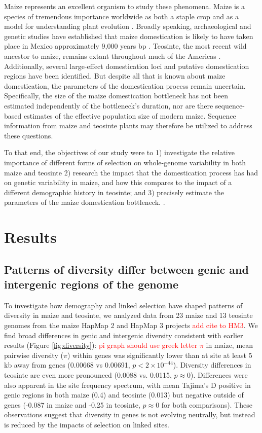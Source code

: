 \documentclass{pnastwo}
\newcommand{\jri}[1]{\textcolor{red}{\scriptsize #1}}
\begin{document}
\begin{article}
Maize represents an excellent organism to study these
phenomena. Maize is a species of tremendous importance worldwide as 
both a staple crop \cite{shiferaw2011} and as a model for
understanding plant evolution \cite{strable2009}. Broadly speaking, archaeological and genetic studies have
established that maize domestication is likely to have taken place in
 Mexico approximately 9,000 years bp
\cite{smith1995,matsuoka2002}. Teosinte, the most
recent wild ancestor to maize, remains extant throughout much of the
Americas \cite{wilkes1967}. Additionally, several large-effect
domestication loci \cite{doebley1995, wills2013, wang2015} and putative domestication
regions \cite{hufford2012} have been identified. But despite all that is
known about maize domestication, the parameters of the
domestication process remain uncertain. Specifically, the size of the
maize domestication bottleneck has not been estimated independently of
the bottleneck's duration, nor are there sequence-based estimates of the effective
population size of modern maize. Sequence information from maize and
teosinte plants may therefore be utilized to address these questions.

To that end, the objectives of our study were to 1) investigate the
relative importance of different forms of selection on whole-genome
variability in both maize and teosinte 2) research the impact that the
domestication process has had on genetic variability in maize, and how
this compares to the impact of a different demographic history in
teosinte; and 3) precisely estimate the parameters of the
maize domestication bottleneck.  \cite{chia2012}.

\section{Results}
\subsection{Patterns of diversity differ between genic and  intergenic regions of the genome}
To investigate how demography and linked selection have shaped patterns of diversity in maize and teosinte, we analyzed data from 23 maize and 13 teosinte genomes from the maize HapMap 2 and HapMap 3 projects \cite{chia2012} \jri{add cite to HM3}.
We find broad differences in genic and intergenic diversity consistent with earlier results  \cite{hufford2012}(Figure \ref{fig:diversity}):  \jri{pi graph should use greek letter $\pi$} in maize, mean pairwise diversity ($\pi$) within genes was significantly lower than at site at least 5 kb away from genes (0.00668 vs 0.00691, $p<2\times 10^{-44}$). 
Diversity differences in teosinte are even more pronounced (0.0088 vs. 0.0115, $p\approx 0$). 
Differences were also apparent in the site frequency spectrum, with mean Tajima's D positive in genic regions in both maize (0.4) and teosinte (0.013) but negative outside of genes (-0.087 in maize and -0.25 in teosinte, $p\approx 0$ for both comparisons).
These observations suggest that diversity in genes is not evolving neutrally, but instead is reduced by the impacts of selection on linked sites. 


\end{article}
\end{document}

